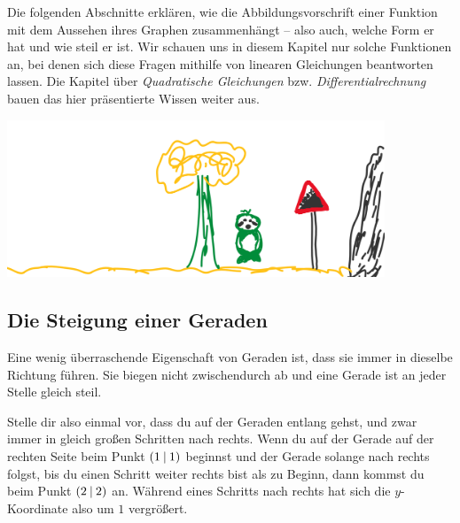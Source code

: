 \documentclass[../../main.tex]{subfiles}
\begin{document}
Die folgenden Abschnitte erklären, wie die Abbildungsvorschrift einer Funktion mit dem Aussehen ihres Graphen zusammenhängt -- also auch, welche Form er hat und wie steil er ist. Wir schauen uns in diesem Kapitel nur solche Funktionen an, bei denen sich diese Fragen mithilfe von linearen Gleichungen beantworten lassen. Die Kapitel über \emph{Quadratische Gleichungen} bzw. \emph{Differentialrechnung} bauen das hier präsentierte Wissen weiter aus.

\begin{center}
    \includegraphics[height=4.7cm]{images/slope.png}
\end{center}

\subsection{Die Steigung einer Geraden}

Eine wenig überraschende Eigenschaft von Geraden ist, dass sie immer in dieselbe Richtung führen. Sie biegen nicht zwischendurch ab und eine Gerade ist an jeder Stelle gleich steil.

Stelle dir also einmal vor, dass du auf der Geraden entlang gehst, und zwar immer in gleich großen Schritten nach rechts. Wenn du auf der Gerade auf der rechten Seite beim Punkt $\left(1 \:\middle|\: 1\right)$ beginnst und der Gerade solange nach rechts folgst, bis du einen Schritt weiter rechts bist als zu Beginn, dann kommst du beim Punkt $\left(2 \:\middle|\: 2\right)$ an. Während eines Schritts nach rechts hat sich die $y$-Koordinate also um $1$ vergrößert.
\end{document}
